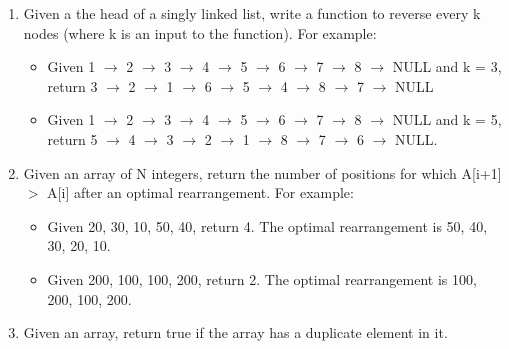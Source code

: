 \documentclass{article}
\begin{document}
\begin{enumerate}

\item Given a the head of a singly linked list, write a function to reverse every k nodes (where k is an input to the function). For example:
\begin{itemize}
\item Given 1 $\xrightarrow{}$ 2 $\xrightarrow{}$ 3 $\xrightarrow{}$ 4 $\xrightarrow{}$ 5 $\xrightarrow{}$ 6 $\xrightarrow{}$ 7 $\xrightarrow{}$ 8 $\xrightarrow{}$ NULL and k = 3, return 3 $\xrightarrow{}$ 2 $\xrightarrow{}$ 1 $\xrightarrow{}$ 6 $\xrightarrow{}$ 5 $\xrightarrow{}$ 4 $\xrightarrow{}$ 8 $\xrightarrow{}$ 7 $\xrightarrow{}$ NULL
\item Given 1 $\xrightarrow{}$ 2 $\xrightarrow{}$ 3 $\xrightarrow{}$ 4 $\xrightarrow{}$ 5 $\xrightarrow{}$ 6 $\xrightarrow{}$ 7 $\xrightarrow{}$ 8 $\xrightarrow{}$ NULL and k = 5, return 5 $\xrightarrow{}$ 4 $\xrightarrow{}$ 3 $\xrightarrow{}$ 2 $\xrightarrow{}$ 1 $\xrightarrow{}$ 8 $\xrightarrow{}$ 7 $\xrightarrow{}$ 6 $\xrightarrow{}$ NULL.
\end{itemize}
    
\item Given an array of N integers, return the number of positions for which A[i+1] $>$ A[i] after an optimal rearrangement. For example:
\begin{itemize} 
\item Given {20, 30, 10, 50, 40}, return 4. The optimal rearrangement is {50, 40, 30, 20, 10}.
\item Given {200, 100, 100, 200}, return 2. The optimal rearrangement is {100, 200, 100, 200}.
\end{itemize}
    
\item Given an array, return true if the array has a duplicate element in it.

\end{enumerate}

\clearpage
\end{document}
